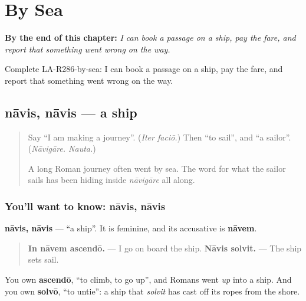
\chapter{By Sea}
\label{ch:la-by-sea}

\begin{chapteropening}
\textbf{By the end of this chapter:} \emph{I can book a passage on a ship, pay the fare, and report that something went wrong on the way.}

Complete LA-R286-by-sea: I can book a passage on a ship, pay the fare, and report that something went wrong on the way.
\end{chapteropening}

\section[nāvis, nāvis]{nāvis, nāvis — a ship}

\label{lesson:LA-C286-navis}



\begin{quote}
Say \textquotedblleft{}I am making a journey\textquotedblright{}. (\emph{Iter faciō.}) Then \textquotedblleft{}to sail\textquotedblright{}, and \textquotedblleft{}a sailor\textquotedblright{}. (\emph{Nāvigāre. Nauta.})

A long Roman journey often went by sea. The word for what the sailor sails has been hiding inside \emph{nāvigāre} all along.
\end{quote}

\subsection*{You'll want to know: nāvis, nāvis}
\textbf{nāvis, nāvis} — \textquotedblleft{}a ship\textquotedblright{}. It is feminine, and its accusative is \textbf{nāvem}.

\begin{quote}
\textbf{In nāvem ascendō.} — I go on board the ship. \textbf{Nāvis solvit.} — The ship sets sail.
\end{quote}

You own \textbf{ascendō}, \textquotedblleft{}to climb, to go up\textquotedblright{}, and Romans went \emph{up} into a ship. And you own \textbf{solvō}, \textquotedblleft{}to untie\textquotedblright{}: a ship that \emph{solvit} has cast off its ropes from the shore.

